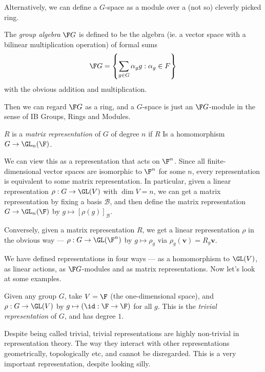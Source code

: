 \documentclass[a4paper]{article}
\begin{document}
Alternatively, we can define a $G$-space as a module over a (not so) cleverly picked ring.
\begin{defi}
  The \emph{group algebra} $\F G$ is defined to be the algebra (ie. a vector space with a bilinear multiplication operation) of formal sums
  \[
    \F G = \left\{ \sum_{g \in G} \alpha_g g: \alpha_g \in F\right\}
  \]
  with the obvious addition and multiplication.
\end{defi}
Then we can regard $\F G$ as a ring, and a $G$-space is just an $\F G$-module in the sense of IB Groups, Rings and Modules.

\begin{defi}
  $R$ is a \emph{matrix representation} of $G$ of degree $n$ if $R$ Is a homomorphism $G \to \GL_n(\F)$.
\end{defi}
We can view this as a representation that acts on $\F^n$. Since all finite-dimensional vector spaces are isomorphic to $\F^n$ for some $n$, every representation is equivalent to some matrix representation. In particular, given a linear representation $\rho: G \to \GL(V)$ with $\dim V = n$, we can get a matrix representation by fixing a basis $\mathcal{B}$, and then define the matrix representation $G \to \GL_n(\F)$ by $g \mapsto [\rho(g)]_{\mathcal{B}}$.

Conversely, given a matrix representation $R$, we get a linear representation $\rho$ in the obvious way --- $\rho: G \to \GL(\F^n)$ by $g \mapsto \rho_g$ via $\rho_g(\mathbf{v}) = R_g \mathbf{v}$.

We have defined representations in four ways --- as a homomorphism to $\GL(V)$, as linear actions, as $\F G$-modules and as matrix representations. Now let's look at some examples.

\begin{eg}
  Given any group $G$, take $V = \F$ (the one-dimensional space), and $\rho: G \to \GL(V)$ by $g \mapsto (\id: \F \to \F)$ for all $g$. This is the \emph{trivial representation} of $G$, and has degree $1$.
\end{eg}
Despite being called trivial, trivial representations are highly non-trivial in representation theory. The way they interact with other representations geometrically, topologically etc, and cannot be disregarded. This is a very important representation, despite looking silly.
\end{document}
